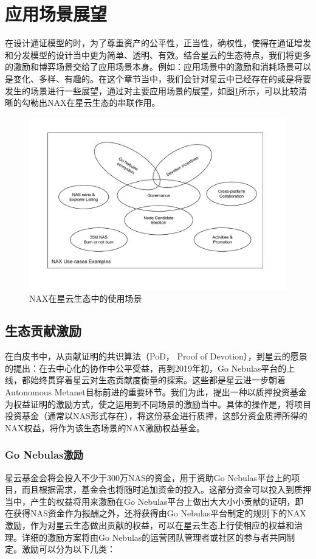\section{应用场景展望}
在设计通证模型的时，为了尊重资产的公平性，正当性，确权性，使得在通证增发和分发模型的设计当中更为简单、透明、有效。结合星云的生态特点，我们将更多的激励和博弈场景交给了应用场景本身。例如：应用场景中的激励和消耗场景可以是变化、多样、有趣的。在这个章节当中，我们会针对星云中已经存在的或是将要发生的场景进行一些展望，通过对主要应用场景的展望，如图\ref{fig:nax_ecosys}所示，可以比较清晰的勾勒出NAX在星云生态的串联作用。

\begin{figure}[htbp]
  \centering
    \includegraphics[width=1\textwidth]{../common/usecases.pdf}
    \caption{NAX在星云生态中的使用场景 \label{fig:nax_ecosys}}
\end{figure}

\subsection{生态贡献激励}
在白皮书中，从贡献证明的共识算法（PoD， Proof of Devotion），到星云的愿景的提出：在去中心化的协作中公平受益，再到2019年初，Go Nebulas平台的上线，都始终贯穿着星云对生态贡献度衡量的探索。这些都是星云进一步朝着Autonomous Metanet目标前进的重要环节。我们为此，提出一种以质押投资基金为权益证明的激励方式，使之运用到不同场景的激励当中。具体的操作是，将项目投资基金（通常以NAS形式存在），将这份基金进行质押，这部分资金质押所得的NAX权益，将作为该生态场景的NAX激励权益基金。

\subsubsection{Go Nebulas激励}
星云基金会将会投入不少于300万NAS的资金，用于资助Go Nebulas平台上的项目，而且根据需求，基金会也将随时追加资金的投入。这部分资金可以投入到质押当中，产生的权益将用来激励在Go Nebulas平台上做出大大小小贡献的证明，即在获得NAS资金作为报酬之外，还将获得由Go Nebulas平台制定的规则下的NAX激励，作为对星云生态做出贡献的权益，可以在星云生态上行使相应的权益和治理。详细的激励方案将由Go Nebulas的运营团队管理者或社区的参与者共同制定。激励可以分为以下几类：

